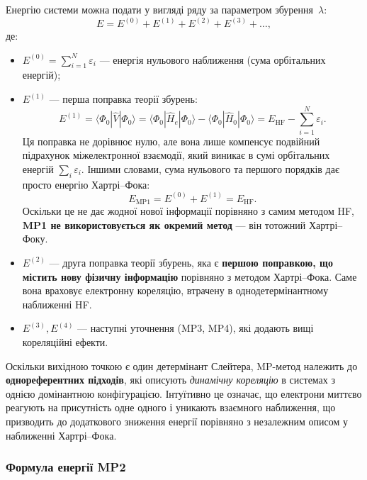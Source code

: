 Енергію системи можна подати у вигляді ряду за параметром збурення~\(\lambda\):
\begin{equation}
    E = E^{(0)} + E^{(1)} + E^{(2)} + E^{(3)} + \ldots,
\end{equation}
де:
\begin{itemize}
    \item \(E^{(0)} = \sum_{i=1}^{N} \varepsilon_i\) --- енергія нульового наближення
          (сума орбітальних енергій);
    \item \(E^{(1)}\) --- перша поправка теорії збурень:
        \begin{equation*}
        E^{(1)} = \langle \Phi_0 | \hat{V} | \Phi_0 \rangle
        = \langle \Phi_0 | \hat{H}_e | \Phi_0 \rangle
        - \langle \Phi_0 | \hat{H}_0 | \Phi_0 \rangle
        = E_{\mathrm{HF}} - \sum_{i=1}^{N} \varepsilon_i.
        \end{equation*}
        Ця поправка не дорівнює нулю, але вона лише компенсує подвійний підрахунок
        міжелектронної взаємодії, який виникає в сумі орбітальних енергій \(\sum_i \varepsilon_i\).
        Іншими словами, сума нульового та першого порядків дає просто енергію Хартрі–Фока:
        \[
        E_{\mathrm{MP1}} = E^{(0)} + E^{(1)} = E_{\mathrm{HF}}.
        \]
        Оскільки це не дає жодної нової інформації порівняно з самим методом HF,
        \textbf{MP1 не використовується як окремий метод} --- він тотожний Хартрі–Фоку.
    \item \(E^{(2)}\) --- друга поправка теорії збурень, яка є \textbf{першою поправкою,
          що містить нову фізичну інформацію} порівняно з методом Хартрі–Фока.
          Саме вона враховує електронну кореляцію, втрачену в однодетермінантному наближенні HF.
    \item \(E^{(3)}, E^{(4)}\) --- наступні уточнення (MP3, MP4), які додають вищі кореляційні ефекти.
\end{itemize}

Оскільки вихідною точкою є один детермінант Слейтера,
MP-метод належить до \textbf{однореферентних підходів},
які описують \emph{динамічну кореляцію} в системах з однією домінантною конфігурацією.
Інтуїтивно це означає, що електрони миттєво реагують на присутність одне одного
і уникають взаємного наближення, що призводить до додаткового зниження енергії
порівняно з незалежним описом у наближенні Хартрі–Фока.

\subsubsection{Формула енергії MP2}


